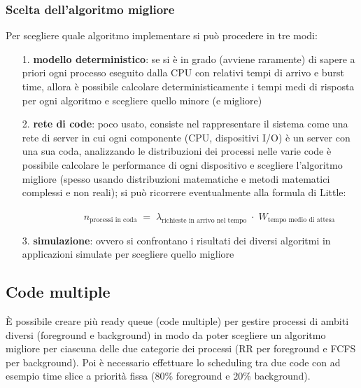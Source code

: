 \documentclass[a4paper]{article}
\begin{document}
\subsubsection*{Scelta dell'algoritmo migliore}
Per scegliere quale algoritmo implementare si può procedere in tre modi:
\begin{itemize}
	\item[1.] \textbf{modello deterministico}: se si è in grado (avviene raramente) di sapere a priori ogni processo eseguito
	dalla CPU con relativi tempi di arrivo e burst time, allora è possibile calcolare deterministicamente i tempi medi di
	risposta per ogni algoritmo e scegliere quello minore (e migliore)
	\item[2.]\textbf{rete di code}: poco usato, consiste nel rappresentare il sistema come una rete di server in cui ogni
	componente (CPU, dispositivi I/O) è un server con una sua coda, analizzando le distribuzioni dei processi nelle varie
	code è possibile calcolare le performance di ogni dispositivo e scegliere l'algoritmo migliore (spesso usando distribuzioni
	matematiche e metodi matematici complessi e non reali); si può ricorrere eventualmente alla formula di Little:
	\begin{center}
		\vspace{-10pt}
		\(\;\qquad\qquad\qquad n_\text{processi in coda} \;=\;\lambda_\text{richieste in arrivo nel tempo} \;\cdot\; W_\text{tempo medio di attesa}\)
		\vspace{-5pt}
	\end{center}
	\item[3.] \textbf{simulazione}: ovvero si confrontano i risultati dei diversi algoritmi in applicazioni simulate per
	scegliere quello migliore
\end{itemize}


\subsection{Code multiple}
È possibile creare più ready queue (code multiple) per gestire processi di ambiti diversi (foreground e background) in modo
da poter scegliere un algoritmo migliore per ciascuna delle due categorie dei processi (RR per foreground e FCFS per background).
Poi è necessario effettuare lo scheduling tra due code con ad esempio time slice a priorità fissa (80\% foreground e 20\% background).
\end{document}
